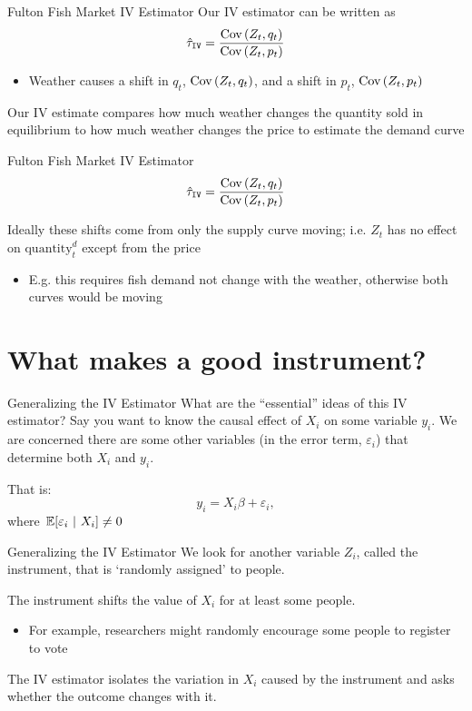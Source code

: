 \documentclass[aspectratio=169,t,11pt,table]{beamer}
\begin{document}
\begin{frame}{Fulton Fish Market IV Estimator}
  Our IV estimator can be written as
  $$
    \hat{\tau}_{\texttt{IV}} = \frac{\cov{Z_t, q_t}}{\cov{Z_t, p_t}}
  $$

  \begin{itemize}
    \item Weather causes a shift in $q_t$, $\cov{Z_t, q_t}$, and a shift in $p_t$, $\cov{Z_t, p_t}$
  \end{itemize}

  \bigskip
  Our IV estimate compares how much weather changes the quantity sold in equilibrium to how much weather changes the price to estimate the demand curve
\end{frame}

\begin{frame}{Fulton Fish Market IV Estimator}
  \vspace{-\bigskipamount}
  $$
    \hat{\tau}_{\texttt{IV}} = \frac{\cov{Z_t, q_t}}{\cov{Z_t, p_t}}
  $$

  \bigskip
  Ideally these shifts come from only the supply curve moving; i.e. $Z_t$ has no effect on $\text{quantity}_t^d$ except from the price
  \begin{itemize}
    \item E.g. this requires fish demand not change with the weather, otherwise both curves would be moving
  \end{itemize}
\end{frame}

\section{What makes a good instrument?}

\begin{frame}{Generalizing the IV Estimator}
  What are the ``essential'' ideas of this IV estimator? Say you want to know the causal effect of $X_i$ on some variable $y_i$. We are concerned there are some other variables (in the error term, $\varepsilon_i$) that determine both $X_i$ and $y_i$.

  That is:
  $$
    y_i = X_i \beta + \varepsilon_i,
  $$
  where $\expec{\varepsilon_i}{X_i} \neq 0$
\end{frame}

\begin{frame}{Generalizing the IV Estimator}
  We look for another variable $Z_i$, called the instrument, that is `randomly assigned' to people.

  \bigskip
  The instrument shifts the value of $X_i$ for at least some people.
  \begin{itemize}
    \item For example, researchers might randomly encourage some people to register to vote
  \end{itemize}

  \pause
  \bigskip
  The IV estimator isolates the variation in $X_i$ caused by the instrument and asks whether the outcome changes with it.
\end{frame}
\end{document}
